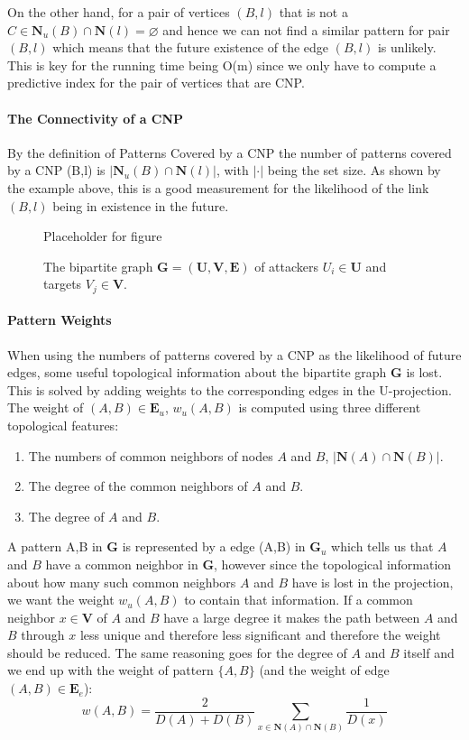 On the other hand, for a pair of vertices $(B,l)$ that is not a $C\in\textbf{N}_u(B)\cap\textbf{N}(l) = \varnothing$ and hence we can not find a similar pattern for pair $(B,l)$ which means that the future existence of the edge $(B,l)$ is unlikely. This is key for the running time being O(m) since we only have to compute a predictive index for the pair of vertices that are CNP.

\paragraph{The Connectivity of a CNP}
By the definition of Patterns Covered by a CNP the number of patterns covered by a CNP (B,l) is $|\textbf{N}_u(B)\cap\textbf{N}(l)|$, with $|\cdot|$ being the set size. As shown by the example above, this is a good measurement for the likelihood of the link $(B,l)$ being in existence in the future.

\begin{figure}[!ht]
\centering
Placeholder for figure
\vspace{5cm}
\caption{\label{fig:cnp} The bipartite graph $\textbf{G}=(\textbf{U},\textbf{V},\textbf{E})$ of attackers $U_i\in\textbf{U}$ and targets $V_j\in\textbf{V}$.}
\end{figure}

\paragraph{Pattern Weights}
When using the numbers of patterns covered by a CNP as the likelihood of future edges, some useful topological information about the bipartite graph $\textbf{G}$ is lost. This is solved by adding weights to the corresponding edges in the U-projection. The weight of $(A,B)\in\textbf{E}_u$, $w_u(A,B)$ is computed using three different topological features:
\begin{enumerate}
\item The numbers of common neighbors of nodes $A$ and $B$, $|\textbf{N}(A)\cap\textbf{N}(B)|$.
\item The degree of the common neighbors of $A$ and $B$.
\item The degree of $A$ and $B$.
\end{enumerate}
A pattern {A,B} in $\textbf{G}$ is represented by a edge (A,B) in $\textbf{G}_u$ which tells us that $A$ and $B$ have a common neighbor in $\textbf{G}$, however since the topological information about how many such common neighbors $A$ and $B$ have is lost in the projection, we want the weight $w_u(A,B)$ to contain that information. If a common neighbor $x\in\textbf{V}$ of $A$ and $B$ have a large degree it makes the path between $A$ and $B$ through $x$ less unique and therefore less significant and therefore the weight should be reduced. The same reasoning goes for the degree of $A$ and $B$ itself and we end up with the weight of pattern $\{A,B\}$ (and the weight of edge $(A,B)\in\textbf{E}_e$):
$$
    w(A,B) = \frac{2}{D(A)+D(B)} \sum_{x\in\textbf{N}(A)\cap\textbf{N}(B)} \frac{1}{D(x)}
$$

